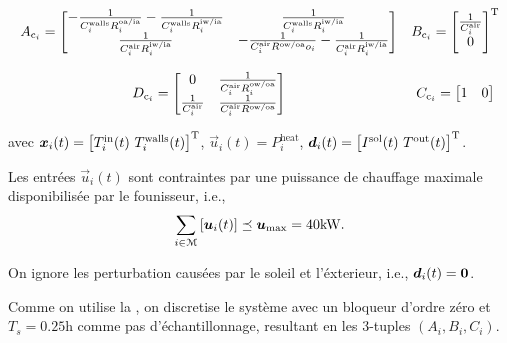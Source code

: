 \documentclass[../main.tex]{subfiles}
\begin{document}
\begin{equation}
  \label{eq:4_fr}
  \begin{matrix}
    A_{\mathrm{c}_{i}}=\left[
    \begin{matrix}
      -\frac{1}{C^{\text{walls}}_{i}R^{\text{oa/ia}}_{i}}-\frac{1}{C^{\text{walls}}_{i}R^{\text{iw/ia}}_{i}}& \frac{1}{C^{\text{walls}}_{i}R^{\text{iw/ia}}_{i}}\\
      \frac{1}{C^{\text{air}}_{i}R^{\text{iw/ia}}_{i}} &-\frac{1}{C^{\text{air}}_{i}R^{\text{ow/oa}}o_{i}}-\frac{1}{C^{\text{air}}_{i}R^{\text{iw/ia}}_{i}}
    \end{matrix}\right]
                                                         &
      B_{\mathrm{c}_{i}}=\left[\begin{matrix}  \frac{1}{C^{\text{air}}_{i}}\\ 0\end{matrix}\right]^{\mathrm{T}}
  \\\\
    D_{\mathrm{c}_{i}}=\left[
    \begin{matrix}
      0& \frac{1}{C^{\text{air}}_{i}R^{\text{ow/oa}}_{i}}\\
      \frac{1}{C^{\text{air}}_{i}} &\frac{1}{C^{\text{air}}_{i}R^{\text{ow/oa}}}
    \end{matrix}\right]&C_{\mathrm{c}_{i}}=\left[\begin{matrix}1 & 0\end{matrix}\right]

\end{matrix}
\end{equation}

avec
${\vec{x}_{i}(t)=\left[T^{\text{in}}_{i}(t)\ T^{\text{walls}}_{i}(t)\right]\T}$,
${\vec{u}_{i}(t)=P^{\text{heat}}_{i}}$,
${\vec{d}_{i}(t)=\left[I^{\text{sol}}(t)\ T^{\text{out}}(t)\right]\T}$.

Les entrées $\vec{u}_{i}(t)$ sont contraintes par une puissance de chauffage maximale disponibilisée par le founisseur, i.e.,
\begin{equation}
\sum\limits_{i\in\mathcal{M}}\left[\boldsymbol{u}_{i}(t)\right]\preceq \boldsymbol{u}_{\max}=40\mathrm{kW}.
\end{equation}

\begin{remark}
  On ignore les perturbation causées par le soleil et l'éxterieur, i.e., $\boldsymbol{d}_{i}(t)=\mathbf{0}$.
\end{remark}

Comme on utilise la \mpc{}, on discretise le système avec un bloqueur d'ordre zéro et $T_{s}=0.25\mathrm{h}$ comme pas d'échantillonnage, resultant en les $3$-tuples $(A_{i},B_{i},C_{i})$.
\end{document}
